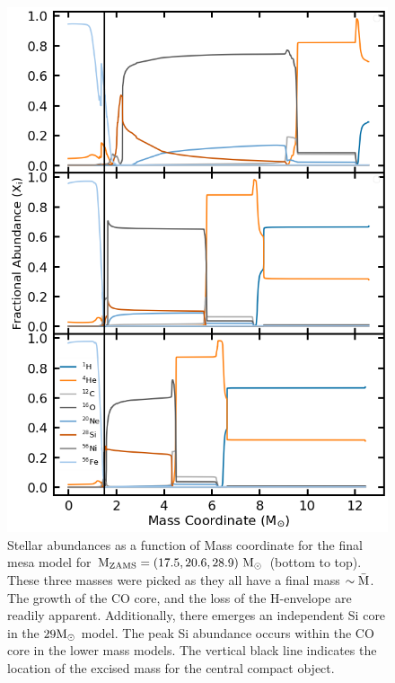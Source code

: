 \documentclass[twocolumn]{aastex631}
\begin{document}
 \begin{figure}[hbt!]
    \centering
    \includegraphics[scale=0.35]{final_profile.png}
    \caption{Stellar abundances as a function of Mass coordinate for the final mesa model for $\rm M_{\rm ZAMS} =(17.5,20.6,28.9)~\rm M_{\odot}$ (bottom to top).  These three masses were picked as they all have a final mass $\sim \bar{\rm M}$. The growth of the CO core, and the loss of the H-envelope are readily apparent. Additionally, there emerges an independent Si core in the $29 \rm M_{\odot}$ model. The peak Si abundance occurs within the CO core in the lower mass models. The vertical black line indicates the location of the excised mass for the central compact object.}
    \label{fig:final_profile}
\end{figure}
\end{document}
